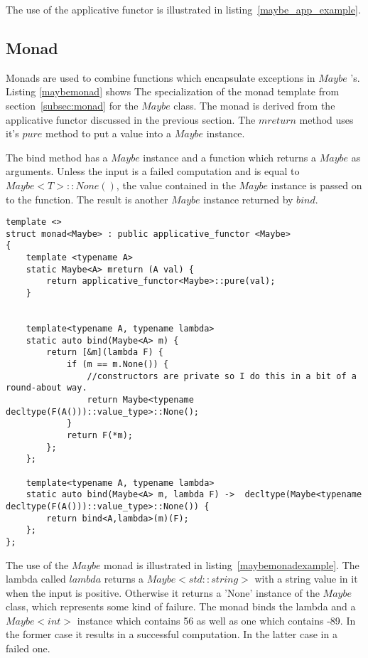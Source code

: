 \documentclass[12pt,fleqn]{article}
\begin{document}
The use of the applicative functor is illustrated in listing~\ref{maybe_app_example}.



%
\subsection{Monad}
%

Monads are used to combine functions which encapsulate exceptions in $Maybe$ 's.
Listing \ref{maybemonad} shows The specialization of the monad template from section~\ref{subsec:monad} for the $Maybe$ class. 
The monad is derived from the applicative functor discussed in the previous section.
The $mreturn$ method uses it's $pure$ method to put a value into a $Maybe$ instance.

The bind method has a $Maybe$ instance and a function which returns a $Maybe$ as arguments.
Unless the input is a failed computation and  is equal to $Maybe<T>::None()$, the value contained in the $Maybe$ instance is passed on to the function.
The result is another $Maybe$ instance returned by $bind$.


%
%
\begin{minipage}{\linewidth}
\begin{lstlisting}[caption=Maybe monad, label=maybemonad]
template <> 
struct monad<Maybe> : public applicative_functor <Maybe>
{
	template <typename A> 
	static Maybe<A> mreturn (A val) {
		return applicative_functor<Maybe>::pure(val);
	}


	template<typename A, typename lambda>
	static auto bind(Maybe<A> m) {
		return [&m](lambda F) {
			if (m == m.None()) {
				//constructors are private so I do this in a bit of a round-about way.
				return Maybe<typename decltype(F(A()))::value_type>::None();
			}
			return F(*m);		
		};
	};

	template<typename A, typename lambda>
	static auto bind(Maybe<A> m, lambda F) ->  decltype(Maybe<typename decltype(F(A()))::value_type>::None()) {
		return bind<A,lambda>(m)(F);
	};
};

\end{lstlisting}
\end{minipage}
%
%
%

The use of the $Maybe$ monad is illustrated in listing~\ref{maybemonadexample}.
The lambda called $lambda$ returns a $Maybe<std::string>$ with a string value in it when the input is positive.
Otherwise it returns a 'None' instance of the $Maybe$ class, which represents some kind of failure.
The monad binds the lambda and a $Maybe<int>$ instance which contains 56 as well as one which contains -89.
In the former case it results in a successful computation.
In the latter case in a failed one.
\end{document}
